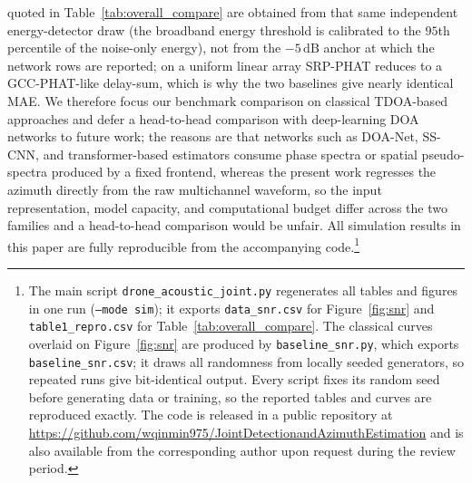 \documentclass[5p,twocolumn]{elsarticle}
\begin{document}
quoted in Table~\ref{tab:overall_compare} are obtained from that same independent energy-detector draw (the broadband energy threshold is calibrated to the $95$th percentile of the noise-only energy), not from the $-5\,\mathrm{dB}$ anchor at which the network rows are reported; on a uniform linear array SRP-PHAT reduces to a GCC-PHAT-like delay-sum, which is why the two baselines give nearly identical MAE. We therefore focus our benchmark comparison on classical TDOA-based approaches and defer a head-to-head comparison with deep-learning DOA networks to future work; the reasons are that networks such as DOA-Net, SS-CNN, and transformer-based estimators consume phase spectra or spatial pseudo-spectra produced by a fixed frontend, whereas the present work regresses the azimuth directly from the raw multichannel waveform, so the input representation, model capacity, and computational budget differ across the two families and a head-to-head comparison would be unfair. All simulation results in this paper are fully reproducible from the accompanying code.\footnote{The main script \texttt{drone\_acoustic\_joint.py} regenerates all tables and figures in one run (\texttt{--mode sim}); it exports \texttt{data\_snr.csv} for Figure~\ref{fig:snr} and \texttt{table1\_repro.csv} for Table~\ref{tab:overall_compare}. The classical curves overlaid on Figure~\ref{fig:snr} are produced by \texttt{baseline\_snr.py}, which exports \texttt{baseline\_snr.csv}; it draws all randomness from locally seeded generators, so repeated runs give bit-identical output. Every script fixes its random seed before generating data or training, so the reported tables and curves are reproduced exactly. The code is released in a public repository at \url{https://github.com/wqinmin975/JointDetectionandAzimuthEstimation} and is also available from the corresponding author upon request during the review period.}
\end{document}
